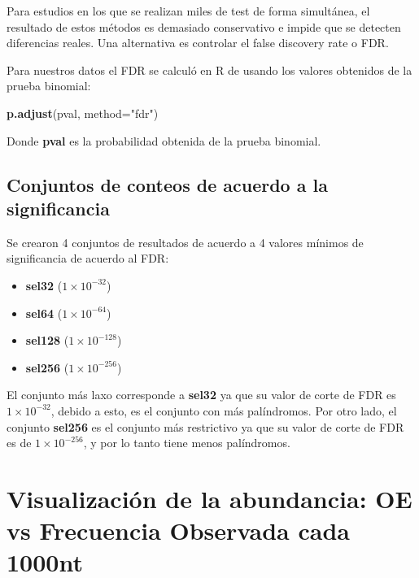 \documentclass[
]{book}
\newenvironment{Shaded}{\begin{snugshade}}{\end{snugshade}}
\newcommand{\AttributeTok}[1]{\textcolor[rgb]{0.13,0.29,0.53}{#1}}
\newcommand{\FunctionTok}[1]{\textcolor[rgb]{0.13,0.29,0.53}{\textbf{#1}}}
\newcommand{\NormalTok}[1]{#1}
\newcommand{\StringTok}[1]{\textcolor[rgb]{0.31,0.60,0.02}{#1}}
\providecommand{\tightlist}{%
  \setlength{\itemsep}{0pt}\setlength{\parskip}{0pt}}
\begin{document}
Para estudios en los que se realizan miles de test de forma simultánea, el resultado de estos métodos es demasiado conservativo e impide que se detecten diferencias reales. Una alternativa es controlar el false discovery rate o FDR.

Para nuestros datos el FDR se calculó en R de usando los valores obtenidos de la prueba binomial:

\begin{Shaded}
\begin{Highlighting}[]
\FunctionTok{p.adjust}\NormalTok{(pval, }\AttributeTok{method=}\StringTok{"fdr"}\NormalTok{)}
\end{Highlighting}
\end{Shaded}

Donde \textbf{pval} es la probabilidad obtenida de la prueba binomial.

\hypertarget{conjuntos-de-conteos-de-acuerdo-a-la-significancia}{%
\subsection{Conjuntos de conteos de acuerdo a la significancia}\label{conjuntos-de-conteos-de-acuerdo-a-la-significancia}}

Se crearon 4 conjuntos de resultados de acuerdo a 4 valores mínimos de significancia de acuerdo al FDR:

\begin{itemize}
\tightlist
\item
  \textbf{sel32} (\(1 \times 10^{-32}\))
\item
  \textbf{sel64} (\(1 \times 10^{-64}\))
\item
  \textbf{sel128} (\(1 \times 10^{-128}\))
\item
  \textbf{sel256} (\(1 \times 10^{-256}\))
\end{itemize}

El conjunto más laxo corresponde a \textbf{sel32} ya que su valor de corte de FDR es \(1 \times 10^{-32}\), debido a esto, es el conjunto con más palíndromos. Por otro lado, el conjunto \textbf{sel256} es el conjunto más restrictivo ya que su valor de corte de FDR es de \(1 \times 10^{-256}\), y por lo tanto tiene menos palíndromos.

\hypertarget{visualizaciuxf3n-de-la-abundancia-oe-vs-frecuencia-observada-cada-1000nt}{%
\section{Visualización de la abundancia: OE vs Frecuencia Observada cada 1000nt}\label{visualizaciuxf3n-de-la-abundancia-oe-vs-frecuencia-observada-cada-1000nt}}
\end{document}
